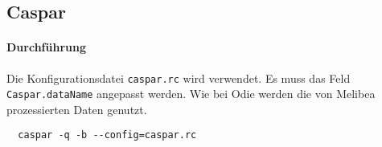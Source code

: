 \subsection{Caspar}%
\label{sub:caspar}

\paragraph{Durchführung}%

Die Konfigurationsdatei \texttt{caspar.rc} wird verwendet.
Es muss das Feld \texttt{Caspar.dataName} angepasst werden.
Wie bei Odie werden die von Melibea prozessierten Daten genutzt.


\begin{lstlisting}
  caspar -q -b --config=caspar.rc
\end{lstlisting}

